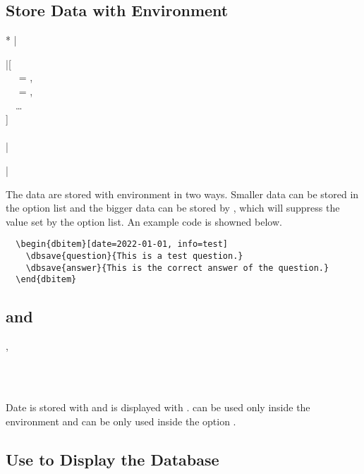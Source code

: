 \documentclass[full]{l3doc}
\begin{document}
\begin{documentation}
\subsection{Store Data with  Environment}

\noindent{}
\begin{Syntax}*
  |\begin{dbitem}|[ \\
  ~~ = , \\
  ~~ = , \\
  ~~\ldots{} \\
  ] \\
  ~~ \\
  |\end{dbitem}|
\end{Syntax}

The data are stored with  environment in two ways. Smaller data
can be stored in the option list and the bigger data can be stored by
, which will suppress the value set by the option list. An example
code is showned below.

\begin{verbatim}
  \begin{dbitem}[date=2022-01-01, info=test]
    \dbsave{question}{This is a test question.}
    \dbsave{answer}{This is the correct answer of the question.}
  \end{dbitem}
\end{verbatim}

\subsection{ and }

\begin{function}{\dbsave, \dbuse}
  \begin{syntax}
       \\
       \\
  \end{syntax}

  Date is stored with  and is displayed with .  
  can be used only inside the  environment and  can be
  only used inside the option .
\end{function}

\subsection{Use  to Display the Database}


\end{documentation}
\end{document}
